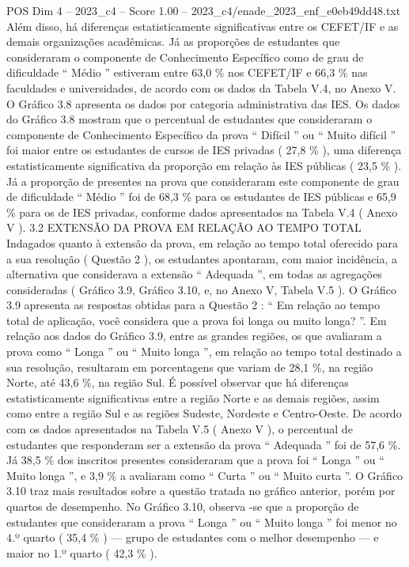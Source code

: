 \begin{textsample}{POS Dim 4 – 2023\_c4 – Score 1.00 – 2023\_c4/enade\_2023\_enf\_e0eb49dd48.txt}
Além disso, há diferenças estatisticamente significativas entre os CEFET/IF e as demais organizações acadêmicas.
Já as proporções de estudantes que consideraram o componente de Conhecimento Específico como de grau de dificuldade “ Médio ” estiveram entre 63,0 \% nos CEFET/IF e 66,3 \% nas faculdades e universidades, de acordo com os dados da Tabela V.4, no Anexo V.
O Gráfico 3.8 apresenta os dados por categoria administrativa das IES.
Os dados do Gráfico 3.8 mostram que o percentual de estudantes que consideraram o componente de Conhecimento Específico da prova “ Difícil ” ou “ Muito difícil ” foi maior entre os estudantes de cursos de IES privadas ( 27,8 \% ), uma diferença estatisticamente significativa da proporção em relação às IES públicas ( 23,5 \% ).
Já a proporção de presentes na prova que consideraram este componente de grau de dificuldade “ Médio ” foi de 68,3 \% para os estudantes de IES públicas e 65,9 \% para os de IES privadas, conforme dados apresentados na Tabela V.4 ( Anexo V ). 3.2 EXTENSÃO DA PROVA EM RELAÇÃO AO TEMPO TOTAL Indagados quanto à extensão da prova, em relação ao tempo total oferecido para a sua resolução ( Questão 2 ), os estudantes apontaram, com maior incidência, a alternativa que considerava a extensão “ Adequada ”, em todas as agregações consideradas ( Gráfico 3.9, Gráfico 3.10, e, no Anexo V, Tabela V.5 ).
O Gráfico 3.9 apresenta as respostas obtidas para a Questão 2 : “ Em relação ao tempo total de aplicação, você considera que a prova foi longa ou muito longa? ”.
Em relação aos dados do Gráfico 3.9, entre as grandes regiões, os que avaliaram a prova como “ Longa ” ou “ Muito longa ”, em relação ao tempo total destinado a sua resolução, resultaram em porcentagens que variam de 28,1 \%, na região Norte, até 43,6 \%, na região Sul.
É possível observar que há diferenças estatisticamente significativas entre a região Norte e as demais regiões, assim como entre a região Sul e as regiões Sudeste, Nordeste e Centro-Oeste.
De acordo com os dados apresentados na Tabela V.5 ( Anexo V ), o percentual de estudantes que responderam ser a extensão da prova “ Adequada ” foi de 57,6 \%.
Já 38,5 \% dos inscritos presentes consideraram que a prova foi “ Longa ” ou “ Muito longa ”, e 3,9 \% a avaliaram como “ Curta ” ou “ Muito curta ”.
O Gráfico 3.10 traz mais resultados sobre a questão tratada no gráfico anterior, porém por quartos de desempenho.
No Gráfico 3.10, observa -se que a proporção de estudantes que consideraram a prova “ Longa ” ou “ Muito longa ” foi menor no 4.º quarto ( 35,4 \% ) — grupo de estudantes com o melhor desempenho — e maior no 1.º quarto ( 42,3 \% ).

\end{textsample}
